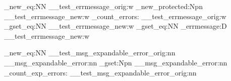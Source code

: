 \cs_new_eq:NN \__test_errmessage_orig:w \errmessage
\cs_new_protected:Npn \__test_errmessage_new:w
  {
    \test_count_errors:
    \__test_errmessage_orig:w
  }
\cs_gset_eq:NN \errmessage       \__test_errmessage_new:w
\cs_gset_eq:NN \tex_errmessage:D \__test_errmessage_new:w %

\cs_new_eq:NN \__test_msg_expandable_error_orig:nn
              \__msg_expandable_error:nn
\cs_gset:Npn \__msg_expandable_error:nn
  {
    \test_count_exp_errors:
    \__test_msg_expandable_error_orig:nn
  }
